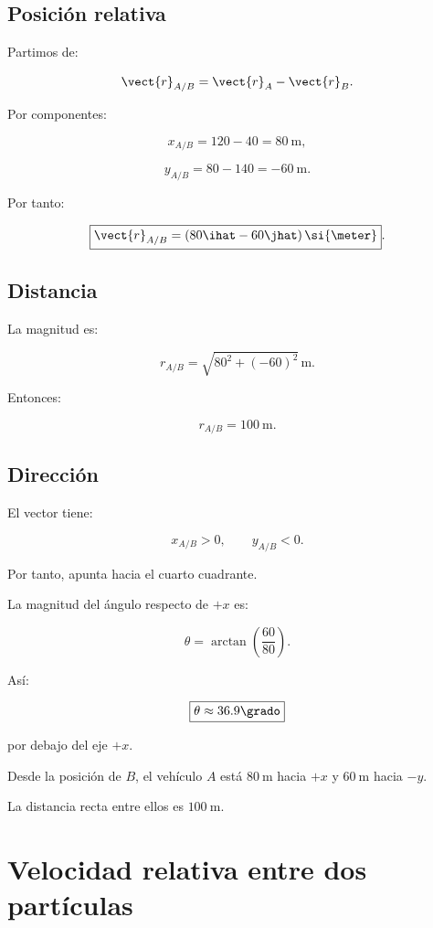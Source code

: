 \subsection*{Posición relativa}

Partimos de:

\[
\vect{r}_{A/B}=\vect{r}_A-\vect{r}_B.
\]

Por componentes:

\[
x_{A/B}=120-40=\SI{80}{\meter},
\]

\[
y_{A/B}=80-140=-\SI{60}{\meter}.
\]

Por tanto:

\[
\boxed{
\vect{r}_{A/B}
=
(80\ihat-60\jhat)\,\si{\meter}
}.
\]

\subsection*{Distancia}

La magnitud es:

\[
r_{A/B}
=
\sqrt{80^2+(-60)^2}\,\si{\meter}.
\]

Entonces:

\[
\boxed{
r_{A/B}=\SI{100}{\meter}
}.
\]

\subsection*{Dirección}

El vector tiene:

\[
x_{A/B}>0,
\qquad
y_{A/B}<0.
\]

Por tanto, apunta hacia el cuarto cuadrante.

La magnitud del ángulo respecto de \(+x\) es:

\[
\theta
=
\arctan\left(\frac{60}{80}\right).
\]

Así:

\[
\boxed{
\theta\approx36.9\grado
}
\]

por debajo del eje \(+x\).

\begin{interpretacion}

Desde la posición de \(B\), el vehículo \(A\) está
\(\SI{80}{\meter}\) hacia \(+x\) y
\(\SI{60}{\meter}\) hacia \(-y\).

La distancia recta entre ellos es \(\SI{100}{\meter}\).

\end{interpretacion}


\section{Velocidad relativa entre dos partículas}

